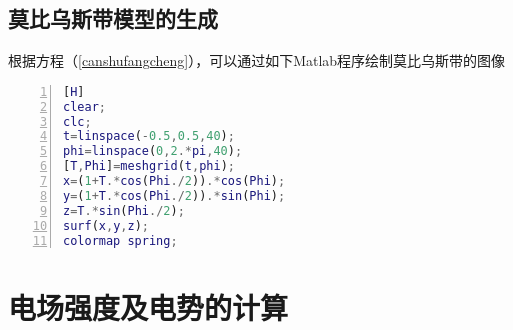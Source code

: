 \subsection{莫比乌斯带模型的生成}
根据方程（\ref{canshufangcheng}），可以通过如下Matlab程序绘制莫比乌斯带的图像
\begin{lstlisting}[language={Matlab},
  numbers=left,
  numberstyle=\tiny\menlo,
  basicstyle=\small\menlo][H]
clear;
clc;
t=linspace(-0.5,0.5,40);
phi=linspace(0,2.*pi,40);
[T,Phi]=meshgrid(t,phi);
x=(1+T.*cos(Phi./2)).*cos(Phi);
y=(1+T.*cos(Phi./2)).*sin(Phi);
z=T.*sin(Phi./2);
surf(x,y,z);
colormap spring;
\end{lstlisting}


\section{电场强度及电势的计算\cite{ref2}}
